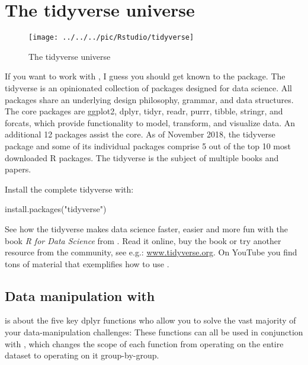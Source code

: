 \chapter{The tidyverse universe}\label{ch:tidyverse}\label{sec:tidyverse}



\begin{figure}[h]
	\centering
	\texttt{[image: ../../../pic/Rstudio/tidyverse]}
	\caption{The tidyverse universe}
	\label{fig:tidyverse}
\end{figure}

If you want to work with \R, I guess you should get known to the  package. 
The tidyverse is an opinionated collection of \R packages designed for data science. All packages share an underlying design philosophy, grammar, and data structures. 
The core packages are ggplot2, dplyr, tidyr, readr, purrr, tibble, stringr, and forcats, which provide functionality to model, transform, and visualize data. An additional 12 packages assist the core. As of November 2018, the tidyverse package and some of its individual packages comprise 5 out of the top 10 most downloaded R packages. The tidyverse is the subject of multiple books and papers.

Install the complete tidyverse with:

\begin{rblock1}
	install.packages("tidyverse")
\end{rblock1}

See how the tidyverse makes data science faster, easier and more fun with the book \textit{R for Data Science} from \cite{Grolemund2018R}. Read it online, buy the book or try another resource from the community, see e.g.: \websmall\url{www.tidyverse.org}.
On YouTube you find tons of material that exemplifies how to use \R. 


\section{Data manipulation with }


\citet[ch. 3]{Grolemund2018R} is about the five key dplyr functions who allow you to solve the vast majority of your data-manipulation
challenges:
These functions can all be used in conjunction with  , which
changes the scope of each function from operating on the entire
dataset to operating on it group-by-group. 

